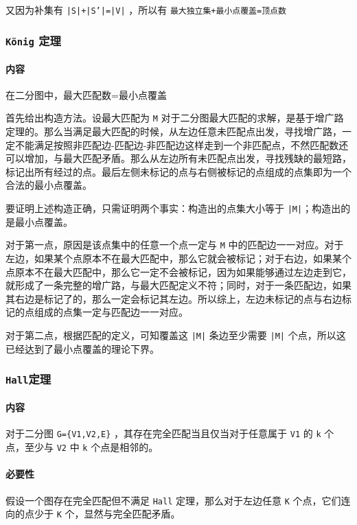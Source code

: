 \documentclass[UTF-8]{ctexart}
\begin{document}
	又因为补集有 \texttt{|S|+|S'|=|V|} ，所以有 \texttt{最大独立集+最小点覆盖=顶点数}
	
	\subsubsection{\texttt{König} 定理}
	\paragraph{内容} 在二分图中，最大匹配数=最小点覆盖
	
	首先给出构造方法。设最大匹配为 \texttt{M} 对于二分图最大匹配的求解，是基于增广路定理的。那么当满足最大匹配的时候，从左边任意未匹配点出发，寻找增广路，一定不能满足按照非匹配边-匹配边-非匹配边这样走到一个非匹配点，不然匹配数还可以增加，与最大匹配矛盾。那么从左边所有未匹配点出发，寻找残缺的最短路，标记出所有经过的点。最后左侧未标记的点与右侧被标记的点组成的点集即为一个合法的最小点覆盖。
	
	要证明上述构造正确，只需证明两个事实：构造出的点集大小等于 \texttt{|M|}；构造出的是最小点覆盖。
	
	对于第一点，原因是该点集中的任意一个点一定与 \texttt{M} 中的匹配边一一对应。对于左边，如果某个点原本不在最大匹配中，那么它就会被标记；对于右边，如果某个点原本不在最大匹配中，那么它一定不会被标记，因为如果能够通过左边走到它，就形成了一条完整的增广路，与最大匹配定义不符；同时，对于一条匹配边，如果其右边是标记了的，那么一定会标记其左边。所以综上，左边未标记的点与右边标记的点组成的点集一定与匹配边一一对应。
	
	对于第二点，根据匹配的定义，可知覆盖这 \texttt{|M|} 条边至少需要 \texttt{|M|} 个点，所以这已经达到了最小点覆盖的理论下界。
	
	\subsubsection{\texttt{Hall}定理}
	\paragraph{内容} 对于二分图 \texttt{G=\{V1,V2,E\}} ，其存在完全匹配当且仅当对于任意属于 \texttt{V1} 的 \texttt{k} 个点，至少与 \texttt{V2} 中 \texttt{k} 个点是相邻的。
	
	\paragraph{必要性} 假设一个图存在完全匹配但不满足 \texttt{Hall} 定理，那么对于左边任意 \texttt{K} 个点，它们连向的点少于 \texttt{K} 个，显然与完全匹配矛盾。
	
\end{document}
